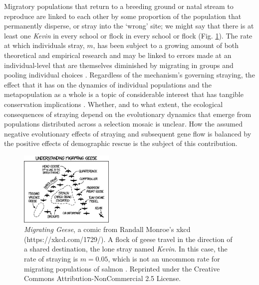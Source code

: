 \documentclass[twocolumn,preprintnumbers,amsmath,amssymb,superscriptaddress]{revtex4}
\begin{document}
Migratory populations that return to a breeding ground or natal stream to reproduce are linked to each other by some proportion of the population that permanently disperse, or stray into the `wrong' site; we might say that there is at least one \emph{Kevin} in every school or flock in every school or flock (Fig. \ref{fig:xkcd}).
The rate at which individuals stray, $m$, has been subject to a growing amount of both theoretical and empirical research \cite{H:2013fs,Keefer:2014gg,Bett:2017ha} and may be linked to errors made at an individual-level that are themselves diminished by migrating in groups and pooling individual choices \cite{Berdahl:2015kv,Berdahl:2016dx}.
Regardless of the mechanism's governing straying, the effect that it has on the dynamics of individual populations and the metapopulation as a whole is a topic of considerable interest that has tangible conservation implications \cite{Brenner:2012gl,Johnson:2012fe,Fullerton:2011ii}.
Whether, and to what extent, the ecological consequences of straying depend on the evolutionary dynamics that emerge from populations distributed across a selection mosaic is unclear.
How the assumed negative evolutionary effects of straying and subsequent gene flow is balanced by the positive effects of demographic rescue is the subject of this contribution.


\begin{figure}
  \captionsetup{justification=raggedright,
singlelinecheck=false
}
\centering
\includegraphics[width=0.4\textwidth]{figs/fig_xkcd.png}
\caption{
\emph{Migrating Geese}, a comic from Randall Monroe's xkcd (https://xkcd.com/1729/). 
A flock of geese travel in the direction of a shared destination, the lone stray named \emph{Kevin}.
In this case, the rate of straying is $m=0.05$, which is not an uncommon rate for migrating populations of salmon \cite{Satterthwaite:2015ge}. 
Reprinted under the Creative Commons Attribution-NonCommercial 2.5 License.
} \label{fig:xkcd}
\end{figure}
\end{document}
